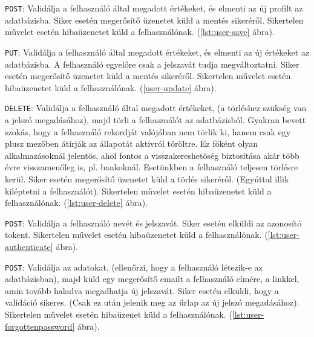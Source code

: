 
\texttt{POST}: Validálja a felhasználó által megadott értékeket, és elmenti az új profilt az adatbázisba.
Siker esetén megerősítő üzenetet küld a mentés sikeréről.
Sikertelen művelet esetén hibaüzenetet küld a felhasználónak. (\ref{lst:user-save} ábra).



\texttt{PUT}: Validálja a felhasználó által megadott értékeket, és elmenti az új értékeket az adatbázisba. A felhasználó egyelőre csak a jelszavát tudja megváltoztatni.
Siker esetén megerősítő üzenetet küld a mentés sikeréről.
Sikertelen művelet esetén hibaüzenetet küld a felhasználónak. (\ref{user-update} ábra).



\texttt{DELETE}: Validálja a felhasználó által megadott értékeket, (a törléshez szükség van a jelszó megadásához), majd törli a felhasználót az adatbázisból. Gyakran bevett szokás, hogy a felhasználó rekordját valójában nem törlik ki, hanem csak egy plusz mezőben átírják az állapotát aktívról töröltre. Ez főként olyan alkalmazásoknál jelentős, ahol fontos a visszakereshetőség biztosítása akár több évre visszamenőleg is, pl. bankoknál. Esetünkben a felhasználó teljesen törlésre kerül.
Siker esetén megerősítő üzenetet küld a törlés sikeréről. (Egyúttal illik kiléptetni a felhasználót).
Sikertelen művelet esetén hibaüzenetet küld a felhasználónak. (\ref{lst:user-delete} ábra).



\texttt{POST}: Validálja a felhasználó nevét és jelszavát.
Siker esetén elküldi az azonosító tokent.
Sikertelen művelet esetén hibaüzenetet küld a felhasználónak. (\ref{lst:user-authenticate} ábra).



\texttt{POST}: Validálja az adatokat, (ellenőrzi, hogy a felhasználó létezik-e az adatbázisban), majd küld egy megerősítő emailt a felhasználó címére, a linkkel, amin tovább haladva megadhatja új jelszavát.
Siker esetén elküldi, hogy a validáció sikeres. (Csak ez után jelenik meg az űrlap az új jelszó megadásához).
Sikertelen művelet esetén hibaüzenet küld a felhasználónak. (\ref{lst:user-forgottenpassword} ábra).

